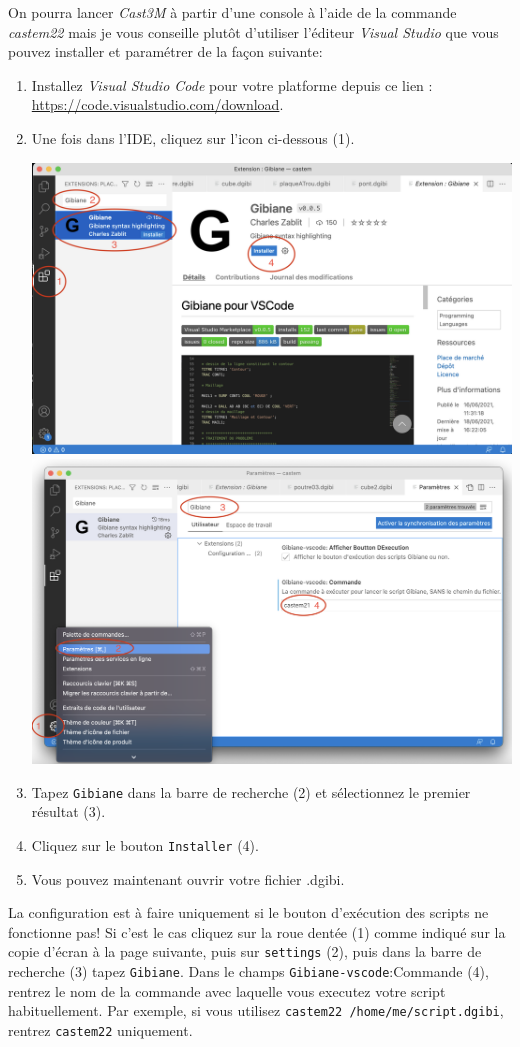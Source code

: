 \documentclass[a4paper,multicol]{article}
\begin{document}
On pourra lancer {\em Cast3M} à partir d'une console à l'aide de la commande {\em castem22} mais je vous conseille plutôt d'utiliser l'éditeur {\em  Visual Studio} que vous pouvez installer et paramétrer de la façon suivante:
\begin{enumerate}
\item Installez {\em Visual Studio Code} pour votre platforme depuis ce lien : \href{https://code.visualstudio.com/download}{https://code.visualstudio.com/download}.
\item Une fois dans l'IDE, cliquez sur l'icon ci-dessous (1). 
\begin{center}
\includegraphics[scale=0.2]{installation2.png} 
\includegraphics[scale=0.19]{configuration-2.png} 
\end{center}
\item Tapez {\tt Gibiane} dans la barre de recherche (2) et sélectionnez le premier résultat (3).
\item Cliquez sur le bouton {\tt Installer} (4).
\item Vous pouvez maintenant ouvrir votre fichier .dgibi.
\end{enumerate}
La configuration est à faire uniquement si le bouton d'exécution des scripts ne fonctionne pas!
Si c'est le cas cliquez sur la roue dentée (1) comme indiqué sur la copie d'écran à la page suivante, puis sur {\tt settings} (2), puis dans la barre de recherche (3) tapez {\tt Gibiane}. Dans le champs {\tt Gibiane-vscode}:Commande (4), rentrez le nom de la commande avec laquelle vous executez votre script habituellement. Par exemple, si vous utilisez {\tt castem22 /home/me/script.dgibi}, rentrez {\tt \color{red}castem22} uniquement. 
\end{document}
